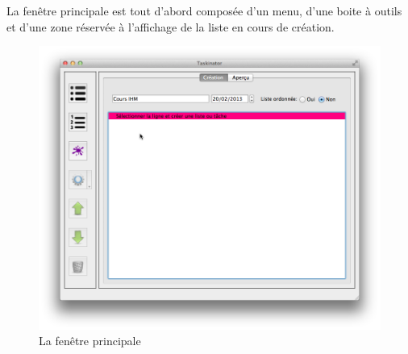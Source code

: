 \documentclass[a4paper,10pt]{article}
\begin{document}
La fenêtre principale est tout d'abord composée d'un menu, d'une boite à outils et d'une zone réservée à l'affichage de la liste en cours de création.
\begin{figure}[H]
    \center
    \includegraphics[width=14cm]{Images/mainWindow.png}
    \caption{La fenêtre principale}
\end{figure}
\end{document}
